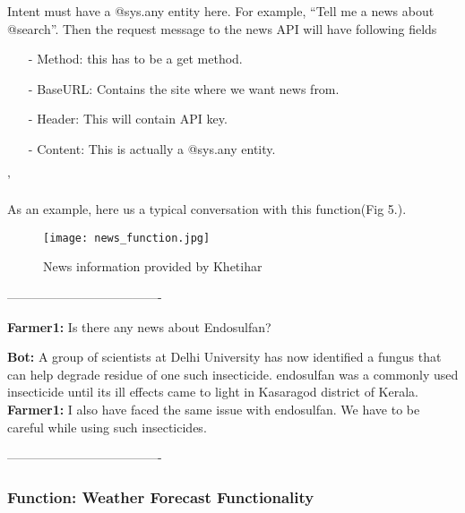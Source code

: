 \documentclass[10pt,conference]{IEEEtran}
\begin{document}
{\raggedright
Intent must have a @sys.any entity here. For example, “Tell me a news about @search”.
Then the request message to the news API will have following fields
}

\begin{itemize}
	\item[-] Method: this has to be a get method.
	\item[-] BaseURL: Contains the site where we want news from.
	\item[-] Header: This will contain API key.
       \item[-] Content: This is actually a @sys.any entity.
\end{itemize}'




{\raggedright
As an example, here us a typical conversation with this function(Fig 5.).
}
\begin{figure}[h]
 \centering
   \texttt{[image: news\_function.jpg]}
  \caption{News information provided by Khetihar }
\end{figure}

{\raggedright
-------------------------------------
}


{\raggedright
\textbf{Farmer1:} Is there any news about Endosulfan?
\newline

\textbf{Bot:} A group of scientists at Delhi University has now identified a fungus that can help degrade residue of one such insecticide. endosulfan was a commonly used insecticide until its ill effects came to light in Kasaragod district of Kerala.
\newline
\newline
\textbf{Farmer1:} I also have faced the same issue with endosulfan. We have to be careful while using such insecticides.
\newline
}


{\raggedright
-------------------------------------
\newline
}






	\subsubsection{ Function:   Weather Forecast Functionality}
\end{document}
